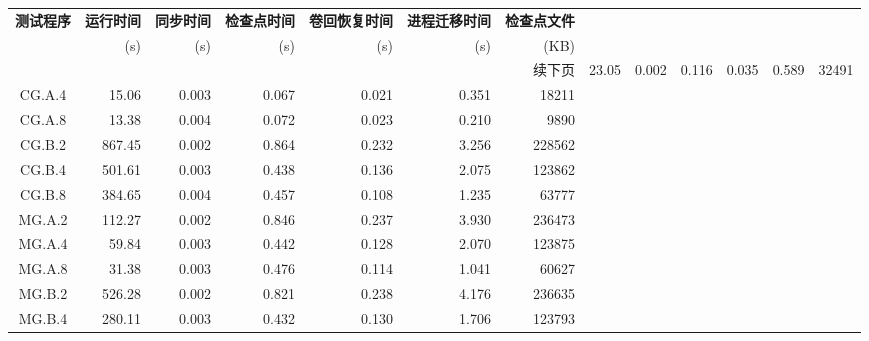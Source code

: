 \begin{ThreePartTable}
\begin{longtable}[c]{@{\extracolsep{\fill}}c*{6}{r}}
    \toprule
    \textbf{测试程序\tnote{b}} & \textbf{运行时间} & \textbf{同步时间}
                           & \textbf{检查点时间} & \textbf{卷回恢复时间}
                           & \textbf{进程迁移时间} & \textbf{检查点文件} \\
                           & {(s)}            & {(s)}
                           & {(s)}            & {(s)}
                           & {(s)}            & {(KB)}              \\
    \midrule
    \endhead
    \hline
    \multicolumn{7}{r}{续下页}
    \endfoot
    \insertTableNotes
    \endlastfoot
    CG.C.2                 & 23.05                               & 0.002                               & 0.116          & 0.035 & 0.589 & 32491  \\
    CG.A.4                 & 15.06                               & 0.003                               & 0.067          & 0.021 & 0.351 & 18211  \\
    CG.A.8                 & 13.38                               & 0.004                               & 0.072          & 0.023 & 0.210 & 9890   \\
    CG.B.2                 & 867.45                              & 0.002                               & 0.864          & 0.232 & 3.256 & 228562 \\
    CG.B.4                 & 501.61                              & 0.003                               & 0.438          & 0.136 & 2.075 & 123862 \\
    CG.B.8                 & 384.65                              & 0.004                               & 0.457          & 0.108 & 1.235 & 63777  \\
    MG.A.2                 & 112.27                              & 0.002                               & 0.846\tnote{a} & 0.237 & 3.930 & 236473 \\
    MG.A.4                 & 59.84                               & 0.003                               & 0.442          & 0.128 & 2.070 & 123875 \\
    MG.A.8                 & 31.38                               & 0.003                               & 0.476          & 0.114 & 1.041 & 60627  \\
    MG.B.2                 & 526.28                              & 0.002                               & 0.821          & 0.238 & 4.176 & 236635 \\
    MG.B.4                 & 280.11                              & 0.003                               & 0.432          & 0.130 & 1.706 & 123793 \\

\end{longtable}
\end{ThreePartTable}
